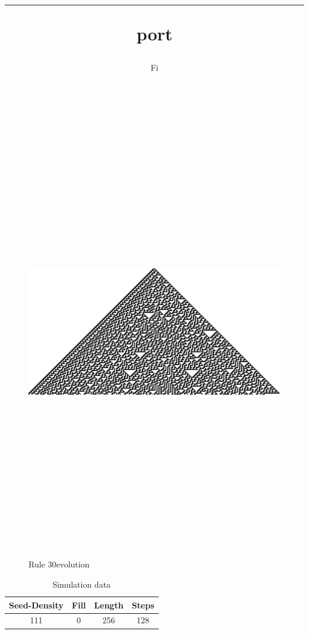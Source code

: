 \documentclass[12pt, letterpaper]{article}
\title{ \rule report}
\author{Fi }
\renewcommand{\rule}{Rule 30}
\begin{document}
 
\begin{titlepage} 
\maketitle 
\tableofcontents 
\end{titlepage} 
\clearpage 
\begin{figure}[H]
  \centering
  \includegraphics[height=200mm, width=200mm, keepaspectratio]{simAnalysis.png} 
   \caption{\rule evolution} 
\end{figure}
\begin{table}[H]
  \centering
  \begin{tabular}{|c|c|c|c| }
     \hline Seed-Density & Fill & Length & Steps \\ 
      \hline 111 & 0 & 256 & 128 \\ 
      \hline 
       \end{tabular} 
      \caption{Simulation data} 
    \end{table} 
\end{document}
